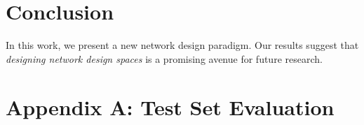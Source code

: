 \documentclass[10pt,twocolumn,letterpaper]{article}
\begin{document}
\section{Conclusion}

In this work, we present a new network design paradigm. Our results suggest that \emph{designing network design spaces} is a promising avenue for future research.

\section*{Appendix A: Test Set Evaluation}
\end{document}
